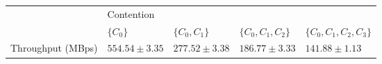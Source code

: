 \begin{tabular}{l|l|l|l|l|}
\cline{2-5}
                                        & \multicolumn{4}{l|}{Contention} \\ \cline{2-5}
                                        & $\{C_{0}\}$ & $\{C_{0}, C_{1}\}$ & $\{C_{0}, C_{1}, C_{2}\}$ & $\{C_{0}, C_{1}, C_{2}, C_{3}\}$ \\ \hline
\multicolumn{1}{|l|}{Throughput (MBps)} & $554.54 \pm 3.35$ & $277.52 \pm 3.38$ & $186.77 \pm 3.33$ & $141.88 \pm 1.13$ \\ \hline
\end{tabular}
